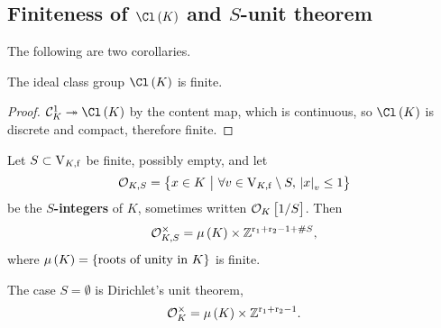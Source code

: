 \pagebreak

\subsection{Finiteness of \texorpdfstring{$ \Cl\br{K} $}{ideal class group} and \texorpdfstring{$ S $}{S}-unit theorem}

The following are two corollaries.

\begin{corollary}
The ideal class group $ \Cl\br{K} $ is finite.
\end{corollary}

\begin{proof}
$ \CCC_K^1 \twoheadrightarrow \Cl\br{K} $ by the content map, which is continuous, so $ \Cl\br{K} $ is discrete and compact, therefore finite.
\end{proof}

\begin{corollary}
\label{cor:7.7}
Let $ S \subset \mathrm{V}_{K, \mathrm{f}} $ be finite, possibly empty, and let
$$ \OOO_{K, S} = \cbr{x \in K \st \forall v \in \V_{K, \f} \setminus S, \ \abs{x}_v \le 1} $$
be the \textbf{$ S $-integers} of $ K $, sometimes written $ \OOO_K\sbr{1 / S} $. Then
$$ \OOO_{K, S}^\times = \mu\br{K} \times \ZZ^{\r_1 + \r_2 - 1 + \#S}, $$
where $ \mu\br{K} = \cbr{\text{roots of unity in} \ K} $ is finite.
\end{corollary}

The case $ S = \emptyset $ is Dirichlet's unit theorem,
$$ \OOO_K^\times = \mu\br{K} \times \ZZ^{\r_1 + \r_2 - 1}. $$

